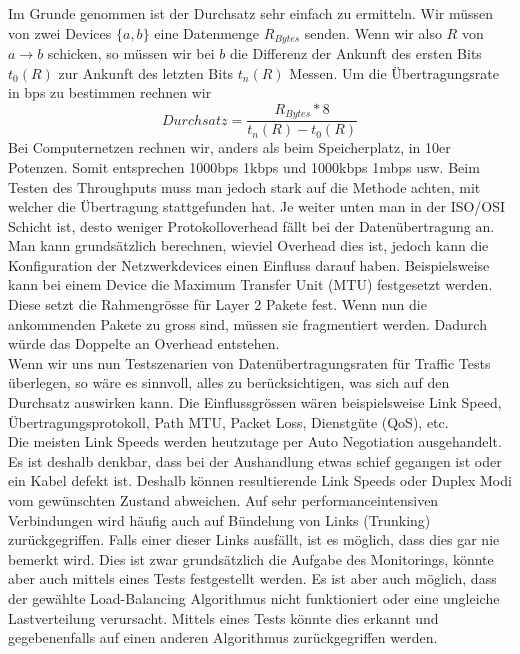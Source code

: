 \documentclass[a4,12pt]{scrartcl}
\begin{document}
\noindent Im Grunde genommen ist der Durchsatz sehr einfach zu ermitteln. Wir müssen von zwei Devices $\{a,b\}$ eine Datenmenge $R_{Bytes}$ senden. Wenn wir also $R$ von $a \rightarrow b$ schicken, so müssen wir bei $b$ die Differenz der Ankunft des ersten Bits $t_0(R)$ zur Ankunft des letzten Bits $t_n(R)$ Messen. Um die Übertragungsrate in bps zu bestimmen rechnen wir
\begin{equation}
Durchsatz = \frac{R_{Bytes} * 8}{t_n(R) - t_0(R)}  
\end{equation} 
Bei Computernetzen rechnen wir, anders als beim Speicherplatz, in 10er Potenzen. Somit entsprechen 1000bps 1kbps und 1000kbps 1mbps usw. Beim Testen des Throughputs muss man jedoch stark auf die Methode achten, mit welcher die Übertragung stattgefunden hat. Je weiter unten man in der ISO/OSI Schicht ist, desto weniger Protokolloverhead fällt bei der Datenübertragung an. Man kann grundsätzlich berechnen, wieviel Overhead dies ist, jedoch kann die Konfiguration der Netzwerkdevices einen Einfluss darauf haben. Beispielsweise kann bei einem Device die Maximum Transfer Unit (MTU) festgesetzt werden. Diese setzt die Rahmengrösse für Layer 2 Pakete fest. Wenn nun die ankommenden Pakete zu gross sind, müssen sie fragmentiert werden. Dadurch würde das Doppelte an Overhead entstehen.\\

\noindent Wenn wir uns nun Testszenarien von Datenübertragungsraten für Traffic Tests überlegen, so wäre es sinnvoll, alles zu berücksichtigen, was sich auf den Durchsatz auswirken kann. Die Einflussgrössen wären beispielsweise Link Speed, Übertragungsprotokoll, Path MTU, Packet Loss, Dienstgüte (QoS), etc. \\

\noindent Die meisten Link Speeds werden heutzutage per Auto Negotiation ausgehandelt. Es ist deshalb denkbar, dass bei der Aushandlung etwas schief gegangen ist oder ein Kabel defekt ist. Deshalb können resultierende Link Speeds oder Duplex Modi vom gewünschten Zustand abweichen. Auf sehr performanceintensiven Verbindungen wird häufig auch auf Bündelung von Links (Trunking) zurückgegriffen. Falls einer dieser Links ausfällt, ist es möglich, dass dies gar nie bemerkt wird. Dies ist zwar grundsätzlich die Aufgabe des Monitorings, könnte aber auch mittels eines Tests festgestellt werden. Es ist aber auch möglich, dass der gewählte Load-Balancing Algorithmus nicht funktioniert oder eine ungleiche Lastverteilung verursacht. Mittels eines Tests könnte dies erkannt und gegebenenfalls auf einen anderen Algorithmus zurückgegriffen werden.\\
\end{document}
